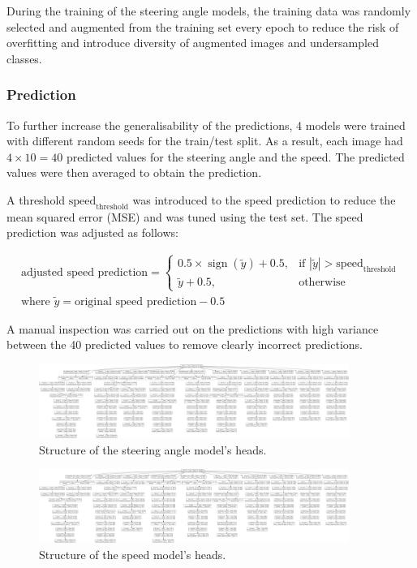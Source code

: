 \documentclass{article}
\begin{document}
During the training of the steering angle models, the training data was randomly selected and augmented from the training set every epoch to reduce the risk of overfitting and introduce diversity of augmented images and undersampled classes.


\subsubsection{Prediction}
To further increase the generalisability of the predictions, 4 models were trained with different random seeds for the train/test split. As a result, each image had \( 4 \times 10 = 40 \) predicted values for the steering angle and the speed. The predicted values were then averaged to obtain the prediction.

A threshold \(\text{speed}_\text{threshold}\) was introduced to the speed prediction to reduce the mean squared error (MSE) and was tuned using the test set. The speed prediction was adjusted as follows:

\[
  \begin{aligned}
    \text{adjusted speed prediction} =
    \begin{cases}
      0.5 \times \operatorname{sign}(\tilde{y}) + 0.5, & \text{if } |\tilde{y}| > \text{speed}_\text{threshold} \\
      \tilde{y} + 0.5,                                 & \text{otherwise}
    \end{cases}
    \\
    \text{where } \tilde{y} = \text{original speed prediction} - 0.5
  \end{aligned}
\]

A manual inspection was carried out on the predictions with high variance between the 40 predicted values to remove clearly incorrect predictions.



\begin{figure}[h]
  \centering
  \includegraphics[width=0.9\textwidth]{figures/angle_heads.png}
  \caption{Structure of the steering angle model's heads.}
  \label{fig:angle_heads}
\end{figure}

\begin{figure}[h]
  \centering
  \includegraphics[width=0.9\textwidth]{figures/speed_heads.png}
  \caption{Structure of the speed model's heads.}
  \label{fig:speed_heads}
\end{figure}
\end{document}
